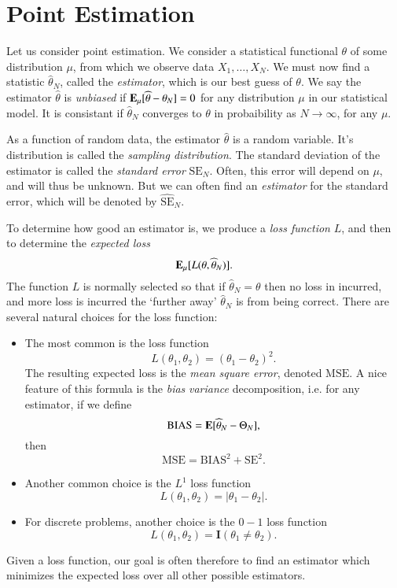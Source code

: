 \chapter{Point Estimation}

Let us consider point estimation. We consider a statistical functional $\theta$ of some distribution $\mu$, from which we observe data $X_1,\dots,X_N$. We must now find a statistic $\widehat{\theta}_N$, called the \emph{estimator}, which is our best guess of $\theta$. We say the estimator $\widehat{\theta}$ is \emph{unbiased} if $\operatorname{\mathbf{E}}_\mu[\widehat{\theta} - \theta_N] = 0$ for any distribution $\mu$ in our statistical model. It is consistant if $\widehat{\theta}_N$ converges to $\theta$ in probaibility as $N \to \infty$, for any $\mu$.

As a function of random data, the estimator $\widehat{\theta}$ is a random variable. It's distribution is called the \emph{sampling distribution}. The standard deviation of the estimator is called the \emph{standard error} $\text{SE}_N$. Often, this error will depend on $\mu$, and will thus be unknown. But we can often find an \emph{estimator} for the standard error, which will be denoted by $\widehat{\text{SE}}_N$.

To determine how good an estimator is, we produce a \emph{loss function} $L$, and then to determine the \emph{expected loss}
%
\[ \operatorname{\mathbf{E}}_\mu[ L(\theta, \widehat{\theta}_N) ]. \]
%
The function $L$ is normally selected so that if $\widehat{\theta}_N = \theta$ then no loss in incurred, and more loss is incurred the `further away' $\widehat{\theta}_N$ is from being correct. There are several natural choices for the loss function:
%
\begin{itemize}
	\item The most common is the loss function
	\[ L(\theta_1,\theta_2) = (\theta_1 - \theta_2)^2. \]
	The resulting expected loss is the \emph{mean square error}, denoted $\text{MSE}$. A nice feature of this formula is the \emph{bias} \emph{variance} decomposition, i.e. for any estimator, if we define
	\[ \text{BIAS} = \operatorname{\mathbf{E}}[ \widehat{\theta}_N - \Theta_N ], \]
	then
	\[ \text{MSE} = \text{BIAS}^2 + \text{SE}^2. \]

	\item Another common choice is the $L^1$ loss function
	\[ L(\theta_1,\theta_2) = |\theta_1 - \theta_2|. \]

	\item For discrete problems, another choice is the $0-1$ loss function
	\[ L(\theta_1,\theta_2) = \mathbf{I}(\theta_1 \neq \theta_2). \]
\end{itemize}
%
Given a loss function, our goal is often therefore to find an estimator which minimizes the expected loss over all other possible estimators.

